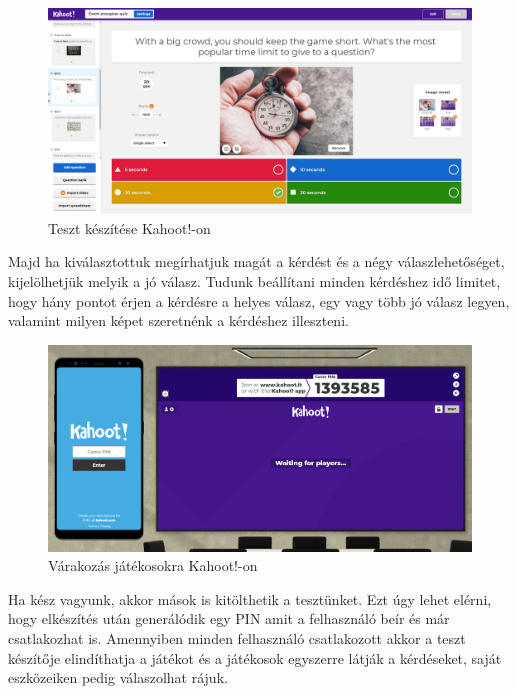 \begin{figure}[h]
  \centering
  \includegraphics[width=\linewidth]{images/kahoot_test_making.PNG}
  \caption{Teszt készítése Kahoot!-on}
\end{figure}

Majd ha kiválasztottuk megírhatjuk magát a kérdést és a négy válaszlehetőséget, kijelölhetjük melyik a jó válasz. Tudunk beállítani minden kérdéshez idő limitet, hogy hány pontot érjen a kérdésre a helyes válasz, egy vagy több jó válasz legyen, valamint milyen képet szeretnénk a kérdéshez illeszteni.


\begin{figure}[h]
  \centering
  \includegraphics[width=\textwidth]{images/kahoot_play.png}
  \caption{Várakozás játékosokra Kahoot!-on}
\end{figure}

Ha kész vagyunk, akkor mások is kitölthetik a tesztünket. Ezt úgy lehet elérni, hogy elkészítés után generálódik egy PIN amit a felhasználó beír és már csatlakozhat is. Amennyiben minden felhasználó csatlakozott akkor a teszt készítője elindíthatja a játékot és a játékosok egyszerre látják a kérdéseket, saját eszközeiken pedig válaszolhat rájuk.


